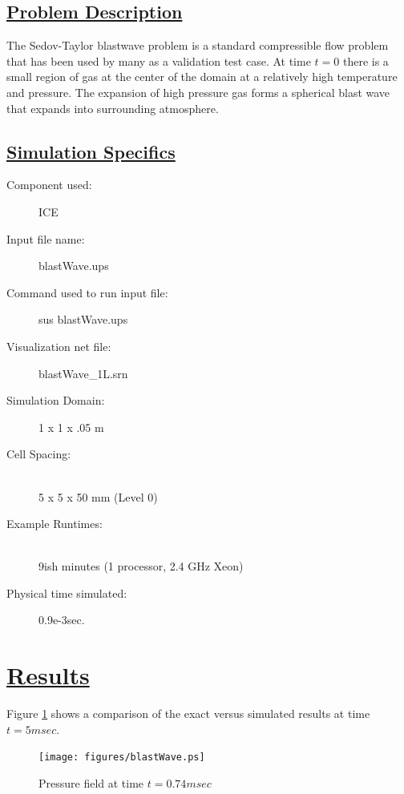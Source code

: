 \documentclass[fleqn]{article}
\begin{document}
\subsection*{\underline{Problem Description}}
The Sedov-Taylor blastwave problem is a standard compressible flow problem that has been used by many
as a validation test case.  At time $t=0$ there is a small region of gas at the center of the domain
at a relatively high temperature and pressure.  The expansion of high pressure gas forms a spherical
blast wave that expands into surrounding atmosphere.
\subsection*{\underline{Simulation Specifics}}
\begin{description} 
\item [Component used:] \hfill ICE
\item [Input file name:] \hfill blastWave.ups
\item [Command used to run input file:]\hfill sus blastWave.ups
\item [Visualization net file:]\hfill blastWave\_1L.srn\\


\item [Simulation Domain:]\hfill    1 x 1 x .05 m
\item [Cell Spacing:]\hfill \\ 
5 x 5 x 50 mm (Level 0)


\item [Example Runtimes:] \hfill \\
 9ish minutes   (1 processor, 2.4 GHz Xeon)

\item [Physical time simulated:] \hfill 0.9e-3sec.

\end{description}

\section*{\underline{Results}}
Figure \ref{results.BW} shows a comparison of the exact versus simulated results at time $t = 5msec$.
\begin{figure}
\texttt{[image: figures/blastWave.ps]}
\caption{Pressure field at time $t = 0.74msec$}
\label{results.BW}
\end{figure}
\newpage

\end{document}
